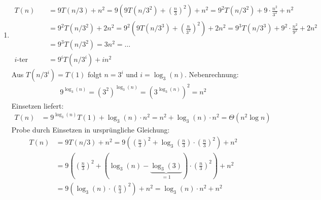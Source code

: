 \documentclass[11pt,a4paper]{article}
\begin{document}
\begin{loesung}
\begin{enumerate}
\begin{enumerate}[label=\roman*)]
        \item
        \begin{align*}
            T(n) &= 9T(n / 3) + n^2 = 9 \left(9T(n / 3^2) + \left(\frac{n}{3}\right)^2 \right) + n^2
            = 9^2 T(n / 3^2) + 9 \cdot \frac{n^2}{3^2} + n^2 \\
            &= 9^2 T(n / 3^2) + 2 n^2 
            = 9^2\left(9T(n / 3^3) + \left(\frac{n}{3^2}\right)^2\right) + 2n^2
            = 9^3T(n / 3^3) + 9^2 \cdot \frac{n^2}{9^2} + 2n^2 \\
            &= 9^3T(n / 3^2) = 3n^2 = \ldots \\
            \text{$i$-ter Schritt: } &= 9^i T(n / 3^i) + i n^2
        \end{align*}
        Aus $T(n / 3^i) = T(1)$ folgt $n = 3^i$ und $i = \log_3(n)$. Nebenrechnung:
        \begin{align*}
            9^{\log_3(n)} = \left(3^2\right)^{\log_3(n)} = \left(3^{\log_3(n)}\right)^{2} = n^2
        \end{align*}
        Einsetzen liefert:
        \begin{align*}
            T(n) &= 9^{\log_3(n)} T(1) + \log_3(n) \cdot n^2 = n^2 + \log_3(n) \cdot n^2 = \Theta(n^2 \log n)
        \end{align*}
        Probe durch Einsetzen in ursprüngliche Gleichung:
        \begin{align*}
            T(n) &= 9T(n / 3) + n^2 = 9\left(\left(\frac{n}{3}\right)^2 + \log_3\left(\frac{n}{3}\right) \cdot \left(\frac{n}{3}\right)^2 \right) + n^2 \\
            &= 9\left(\left(\frac{n}{3}\right)^2 + \left(\log_3(n) - \underbrace{\log_3(3)}_{=1} \right) \cdot \left(\frac{n}{3}\right)^2 \right) + n^2 \\
            &= 9 \left( \log_3(n) \cdot \left(\frac{n}{3}\right)^2 \right) + n^2 
            = \log_3(n) \cdot n^2 + n^2
        \end{align*}

\end{enumerate}
\end{enumerate}
\end{loesung}
\end{document}
